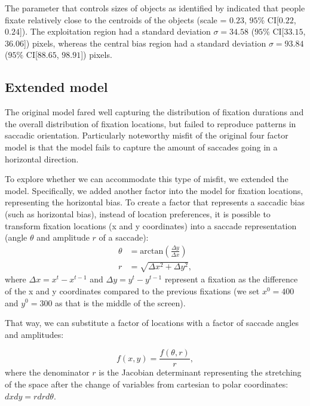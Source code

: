 \documentclass{article}
\begin{document}
The parameter that controls sizes of objects as identified by \citet{xu2014beyond} indicated that people fixate relatively close to the centroids of the objects (scale = $0.23$, $95\%$ CI[$0.22$, $0.24$]). The exploitation region had a standard deviation $\sigma = 34.58$ ($95\%$ CI[$33.15$, $36.06$]) pixels, whereas the central bias region had a standard deviation $\sigma = 93.84$ ($95\%$ CI[$88.65$, $98.91$]) pixels.

\subsection{Extended model}

The original model fared well capturing the distribution of fixation durations and the overall distribution of fixation locations, but failed to reproduce patterns in saccadic orientation. Particularly noteworthy misfit of the original four factor model is that the model fails to capture the amount of saccades going in a horizontal direction.

To explore whether we can accommodate this type of misfit, we extended the model. Specifically, we added another factor into the model for fixation locations, representing the horizontal bias. To create a factor that represents a saccadic bias (such as horizontal bias), instead of location preferences, it is possible to transform fixation locations (x and y coordinates) into a saccade representation (angle $\theta$ and amplitude $r$ of a saccade):
\begin{equation}
    \begin{aligned}
      \theta & = \text{arctan}\left(\frac{\Delta y}{\Delta x}\right) \\
      r & = \sqrt{\Delta x^2 + \Delta y^2},
    \end{aligned}
\end{equation}
where $\Delta x = x^t - x^{t-1}$ and $\Delta y = y^t - y^{t-1}$ represent a fixation as the difference of the x and y coordinates compared to the previous fixations (we set $x^0 = 400$ and $y^0 = 300$ as that is the middle of the screen).

That way, we can substitute a factor of locations with a factor of saccade angles and amplitudes:

\begin{equation}
    f(x, y) = \frac{f(\theta, r)}{r},
\end{equation}
where the denominator $r$ is the Jacobian determinant representing the stretching of the space after the change of variables from cartesian to polar coordinates: $dx dy = r dr d\theta$. 
\end{document}
